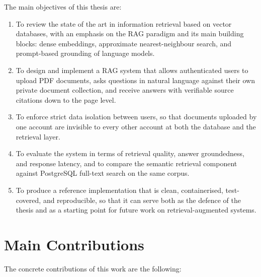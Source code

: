 The main objectives of this thesis are:

\begin{enumerate}
  \item To review the state of the art in information retrieval based on
        vector databases, with an emphasis on the RAG paradigm and its main
        building blocks: dense embeddings, approximate nearest-neighbour
        search, and prompt-based grounding of language models.
  \item To design and implement a RAG system that allows authenticated users
        to upload PDF documents, asks questions in natural language against
        their own private document collection, and receive answers with
        verifiable source citations down to the page level.
  \item To enforce strict data isolation between users, so that documents
        uploaded by one account are invisible to every other account at both
        the database and the retrieval layer.
  \item To evaluate the system in terms of retrieval quality, answer
        groundedness, and response latency, and to compare the semantic
        retrieval component against PostgreSQL full-text search on the same
        corpus.
  \item To produce a reference implementation that is clean, containerised,
        test-covered, and reproducible, so that it can serve both as the
        defence of the thesis and as a starting point for future work on
        retrieval-augmented systems.
\end{enumerate}

\section{Main Contributions}
\label{sec:contributions}

The concrete contributions of this work are the following:

